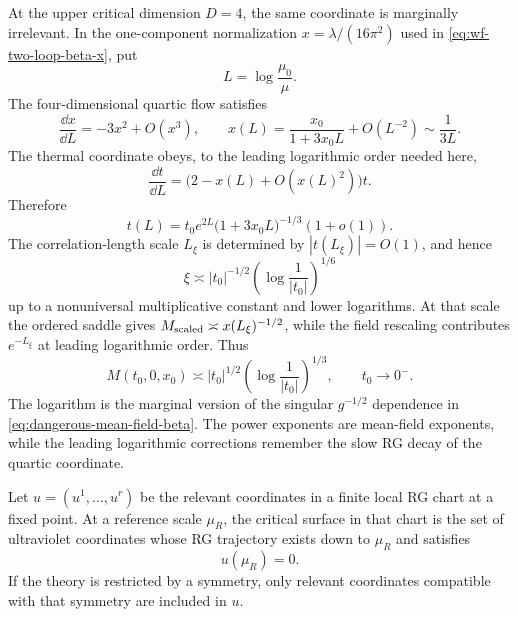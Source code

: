 At the upper critical dimension \(D=4\), the same coordinate is marginally
irrelevant.  In the one-component normalization
\(x=\lambda/(16\pi^2)\) used in
\eqref{eq:wf-two-loop-beta-x}, put
\[
  L=\log\frac{\mu_0}{\mu}.
\]
The four-dimensional quartic flow satisfies
\begin{equation}
  \frac{\dd x}{\dd L}
  =
  -3x^2+O(x^3),
  \qquad
  x(L)
  =
  \frac{x_0}{1+3x_0L}
  +O(L^{-2})
  \sim\frac1{3L}.
  \label{eq:dangerous-four-dimensional-running-x}
\end{equation}
The thermal coordinate obeys, to the leading logarithmic order needed here,
\begin{equation}
  \frac{\dd t}{\dd L}
  =
  \bigl(2-x(L)+O(x(L)^2)\bigr)t .
  \label{eq:dangerous-four-dimensional-running-t}
\end{equation}
Therefore
\[
  t(L)
  =
  t_0 e^{2L}\bigl(1+3x_0L\bigr)^{-1/3}(1+o(1)).
\]
The correlation-length scale \(L_\xi\) is determined by \(|t(L_\xi)|=O(1)\),
and hence
\begin{equation}
  \xi
  \asymp
  |t_0|^{-1/2}
  \left(\log\frac1{|t_0|}\right)^{1/6}
  \label{eq:dangerous-four-dimensional-xi-log}
\end{equation}
up to a nonuniversal multiplicative constant and lower logarithms.  At that
scale the ordered saddle gives \(M_{\rm scaled}\asymp x(L_\xi)^{-1/2}\), while
the field rescaling contributes \(e^{-L_\xi}\) at leading logarithmic order.
Thus
\begin{equation}
  M(t_0,0,x_0)
  \asymp
  |t_0|^{1/2}
  \left(\log\frac1{|t_0|}\right)^{1/3},
  \qquad t_0\to0^- .
  \label{eq:dangerous-four-dimensional-magnetization-log}
\end{equation}
The logarithm is the marginal version of the singular
\(g^{-1/2}\) dependence in \eqref{eq:dangerous-mean-field-beta}.  The
power exponents are mean-field exponents, while the leading logarithmic
corrections remember the slow RG decay of the quartic coordinate.

\begin{definition}
Let \(u=(u^1,\ldots,u^r)\) be the relevant coordinates in a finite local RG
chart at a fixed point.  At a reference scale \(\mu_R\), the critical surface
in that chart is the set of ultraviolet coordinates whose RG trajectory exists
down to \(\mu_R\) and satisfies
\[
  u(\mu_R)=0 .
\]
If the theory is restricted by a symmetry, only relevant coordinates
compatible with that symmetry are included in \(u\).
\end{definition}

